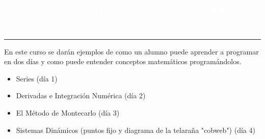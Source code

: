 \begin{titlepage}
\pagecolor{white}
\newcommand{\R}{\ensuremath{\mathbb{R}}}
\BgThispage
{}
\vspace*{-1.1cm}
\noindent
\def\titulo#1{\section{#1}}

\section{\bf\large\textcolor{white}{La computadora: un dispositivo que enriquece el significado de"Entender"}}
\vspace*{2cm}\par
\noindent

\begin{minipage}{0.5\linewidth}
\begin{minipage}{0.45\linewidth}
    \begin{flushright}
        \printauthor
    \end{flushright}
\end{minipage} \hspace{-3pt}
%
\begin{minipage}{0.02\linewidth}
   \color{ptctitle} \rule{1pt}{245pt}
\end{minipage} 
\end{minipage}
\hspace*{-4.5cm}
\begin{minipage}{0.85\linewidth}
\begin{minipage}{0.85\linewidth}
\footnotesize
\vspace{5pt}
    \begin{resumen}
    En este curso se dar\'an ejemplos de como un alumno puede
aprender a programar en dos d\'ias y como puede entender conceptos
matem\'aticos program\'andolos.

\begin{itemize}
\item Series (d\'ia 1)
\item Derivadas e Integraci\'on Num\'erica (d\'ia 2)
\item  El M\'etodo de Montecarlo (d\'ia 3)
\item Sistemas Din\'amicos (puntos fijo y diagrama de la telara\~na "cobweb") (d\'ia 4)
\end{itemize}




\end{resumen}
\end{minipage}
\end{minipage}
\end{titlepage}
